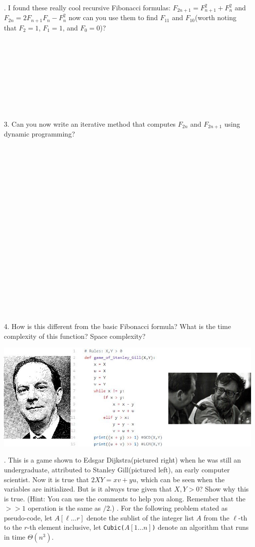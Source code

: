 \documentclass[12pt]{article}
\begin{document}
. I found these really cool recursive Fibonacci formulas: 
$F_{2n+1}=F_{n+1}^{2}+F_{n}^{2}$ and $F_{2n}=2F_{n+1}F_{n}-F_{n}^2$
 now can you use them to find $F_{11}$ and $F_{10}$(worth noting that
 $F_2 = 1$, $F_1 = 1$, and $F_0 = 0$)?\\\\\\\\\\\\\\\\\\\\
 3. Can you now write an iterative method that computes $F_{2n}$ and $F_{2n+1}$
 using dynamic programming?\\\\\\\\\\\\\\\\\\\\\\\\\\\\\\\\\\\\\\\\
 4. How is this different from the basic Fibonacci formula? What is the
 time complexity of this function? Space complexity?
    \FloatBarrier
\newpage
\centerline{\includegraphics[scale = 2]{comb.jpg}}
. This is a game shown to Edsgar Dijkstra(pictured right) when he was still an undergraduate, attributed to Stanley Gill(pictured left), an early computer scientist. Now it is true that $2XY = xv+yu$, which can be seen when the variables are initialized. But is it always true given that $X,Y > 0$? Show why this is true. (Hint: You can use the comments to help you along. Remember that the $>> 1 $ operation is the same as $ / 2$.)
\newpage
{}. For the following problem stated as pseudo-code, let $A[\ell\dots r]$ denote the sublist of the integer list $A$ from the $\ell$-th to the $r$-th element inclusive, let \texttt{Cubic($A[1\dots n]$)} denote an algorithm that runs in time $\Theta(n^3)$.\\
\end{document}
